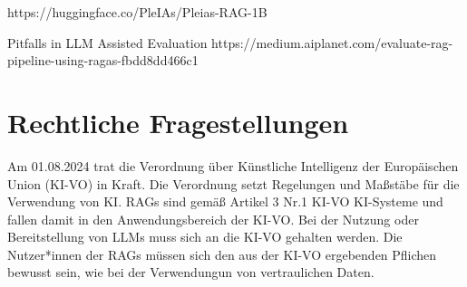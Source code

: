 https://huggingface.co/PleIAs/Pleias-RAG-1B


Pitfalls in LLM Assisted Evaluation https://medium.aiplanet.com/evaluate-rag-pipeline-using-ragas-fbdd8dd466c1

\section{Rechtliche Fragestellungen}

Am 01.08.2024 trat die Verordnung über Künstliche Intelligenz der Europäischen Union (KI-VO) in Kraft. Die Verordnung setzt Regelungen und Maßstäbe für die Verwendung von KI.
RAGs sind gemäß Artikel 3 Nr.1 KI-VO KI-Systeme und fallen damit in den Anwendungsbereich der KI-VO.
Bei der Nutzung oder Bereitstellung von LLMs muss sich an die KI-VO gehalten werden. Die Nutzer*innen der RAGs müssen sich den aus der KI-VO ergebenden Pflichen bewusst sein, wie bei der Verwendungun von vertraulichen Daten.








